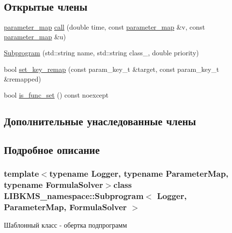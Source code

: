 \subsection*{Открытые члены}
\begin{DoxyCompactItemize}
\item 
\hyperlink{classLIBKMS__namespace_1_1Callable_ad58caabaa5ac247c9d385e6d5451916a}{parameter\-\_\-map} \hyperlink{classLIBKMS__namespace_1_1Subprogram_a2898e1d2ff996ca6de8a0d6480be4e1f}{call} (double time, const \hyperlink{classLIBKMS__namespace_1_1Callable_ad58caabaa5ac247c9d385e6d5451916a}{parameter\-\_\-map} \&v, const \hyperlink{classLIBKMS__namespace_1_1Callable_ad58caabaa5ac247c9d385e6d5451916a}{parameter\-\_\-map} \&u)
\item 
\hyperlink{classLIBKMS__namespace_1_1Subprogram_a2279d8a886dbb2c16955e617c429b842}{Subprogram} (std\-::string name, std\-::string class\-\_\-, double priority)
\item 
bool \hyperlink{classLIBKMS__namespace_1_1Subprogram_ab147a59ea5ce42f20af207c3f1499fb0}{set\-\_\-key\-\_\-remap} (const param\-\_\-key\-\_\-t \&target, const param\-\_\-key\-\_\-t \&remapped)
\item 
bool \hyperlink{classLIBKMS__namespace_1_1Subprogram_a1c6cab2580663cd14f5297cfe6425ccd}{is\-\_\-func\-\_\-set} () const noexcept
\end{DoxyCompactItemize}
\subsection*{Дополнительные унаследованные члены}


\subsection{Подробное описание}
\subsubsection*{template$<$typename Logger, typename Parameter\-Map, typename Formula\-Solver$>$class L\-I\-B\-K\-M\-S\-\_\-namespace\-::\-Subprogram$<$ Logger, Parameter\-Map, Formula\-Solver $>$}

Шаблонный класс -\/ обертка подпрограмм 


